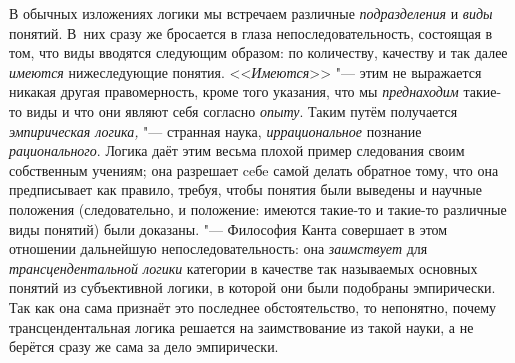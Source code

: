 В обычных изложениях логики мы встречаем различные
{\em подразделения} и {\em виды} понятий. В~них
сразу же бросается в глаза непоследовательность, состоящая в том, что виды
вводятся следующим образом: по количеству, качеству и так далее
{\em имеются} нижеследующие понятия. <<{\em Имеются}>> "--- этим не
выражается никакая другая правомерность, кроме того указания, что мы
{\em преднаходим} такие-то виды и что они являют себя согласно
{\em опыту}. Таким путём получается {\em эмпирическая логика,} "---
странная наука, {\em иррациональное} познание {\em рационального}.
Логика даёт этим весьма плохой пример следования своим
собственным учениям; она разрешает ceбe самой делать обратное тому, что она
предписывает как правило, требуя, чтобы понятия были выведены и научные
положения (следовательно, и положение: имеются такие-то и такие-то
различные виды понятий) были доказаны. "--- Философия Канта
совершает в этом отношении дальнейшую непоследовательность: она
{\em заимствует} для {\em трансцендентальной логики}
категории в качестве так называемых основных
понятий из субъективной логики, в которой они были подобраны эмпирически.
Так как она сама признаёт это последнее обстоятельство, то непонятно,
почему трансцендентальная логика решается на заимствование из такой науки,
а не берётся сразу же сама за дело эмпирически.

